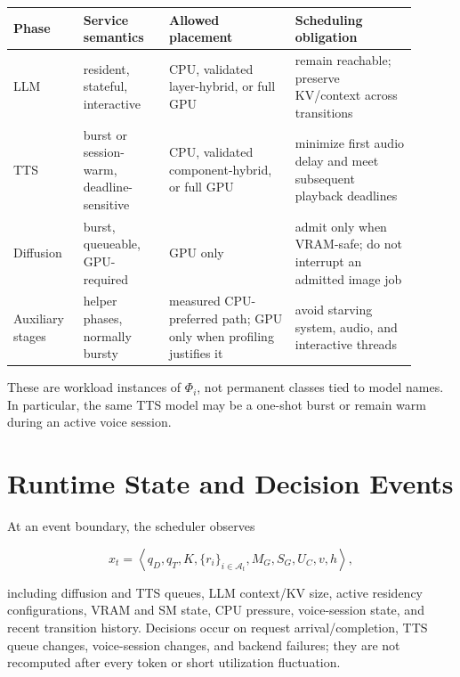 \documentclass[10pt]{article}
\begin{document}
\begin{center}
\begin{tabular}{>{\raggedright\arraybackslash}p{0.15\linewidth}
                >{\raggedright\arraybackslash}p{0.19\linewidth}
                >{\raggedright\arraybackslash}p{0.29\linewidth}
                >{\raggedright\arraybackslash}p{0.27\linewidth}}
\toprule
Phase & Service semantics & Allowed placement & Scheduling obligation \\
\midrule
LLM & resident, stateful, interactive & CPU, validated layer-hybrid, or full GPU
    & remain reachable; preserve KV/context across transitions \\
TTS & burst or session-warm, deadline-sensitive & CPU, validated component-hybrid,
    or full GPU & minimize first audio delay and meet subsequent playback deadlines \\
Diffusion & burst, queueable, GPU-required & GPU only
    & admit only when VRAM-safe; do not interrupt an admitted image job \\
Auxiliary stages & helper phases, normally bursty & measured CPU-preferred path;
    GPU only when profiling justifies it & avoid starving system, audio, and interactive threads \\
\bottomrule
\end{tabular}
\end{center}

These are workload instances of $\Phi_i$, not permanent classes tied to model
names.  In particular, the same TTS model may be a one-shot burst or remain warm
during an active voice session.

\section*{Runtime State and Decision Events}

At an event boundary, the scheduler observes

\begin{equation}
x_t=\left\langle
q_D,q_T,K,{\bigl\{r_i\bigr\}}_{i\in\mathcal A_t},M_G,S_G,U_C,v,h
\right\rangle ,
\end{equation}

including diffusion and TTS queues, LLM context/KV size, active residency
configurations, VRAM and SM state, CPU pressure, voice-session state, and recent
transition history.  Decisions occur on request arrival/completion, TTS queue
changes, voice-session changes, and backend failures; they are not recomputed
after every token or short utilization fluctuation.
\end{document}
